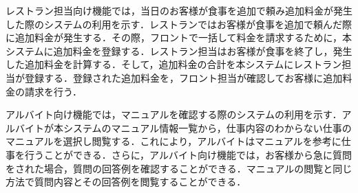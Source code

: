 \documentclass[main]{subfiles}
\begin{document}
レストラン担当向け機能では，当日のお客様が食事を追加で頼み追加料金が発生した際のシステムの利用を示す．レストランではお客様が食事を追加で頼んだ際に追加料金が発生する．その際，フロントで一括して料金を請求するために，本システムに追加料金を登録する．レストラン担当はお客様が食事を終了し，発生した追加料金を計算する．そして，追加料金の合計を本システムにレストラン担当が登録する．登録された追加料金を，フロント担当が確認してお客様に追加料金の請求を行う．


アルバイト向け機能では，マニュアルを確認する際のシステムの利用を示す．アルバイトが本システムのマニュアル情報一覧から，仕事内容のわからない仕事のマニュアルを選択し閲覧する．これにより，アルバイトはマニュアルを参考に仕事を行うことができる．さらに，アルバイト向け機能では，お客様から急に質問をされた場合，質問の回答例を確認することができる．マニュアルの閲覧と同じ方法で質問内容とその回答例を閲覧することができる．
\end{document}
